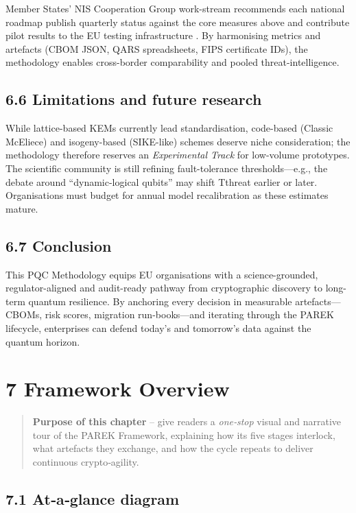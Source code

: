 \documentclass[
  english,
]{article}
\begin{document}
Member States' NIS Cooperation Group work-stream recommends each
national roadmap publish quarterly status against the core measures
above and contribute pilot results to the EU testing infrastructure . By
harmonising metrics and artefacts (CBOM JSON, QARS spreadsheets, FIPS
certificate IDs), the methodology enables cross-border comparability and
pooled threat-intelligence.

\subsection{6.6 Limitations and future
research}\label{limitations-and-future-research}

While lattice-based KEMs currently lead standardisation, code-based
(Classic McEliece) and isogeny-based (SIKE-like) schemes deserve niche
consideration; the methodology therefore reserves an \emph{Experimental
Track} for low-volume prototypes. The scientific community is still
refining fault-tolerance thresholds---e.g., the debate around
``dynamic-logical qubits'' may shift T­­threat earlier or later.
Organisations must budget for annual model recalibration as these
estimates mature.

\subsection{6.7 Conclusion}\label{conclusion}

This PQC Methodology equips EU organisations with a science-grounded,
regulator-aligned and audit-ready pathway from cryptographic discovery
to long-term quantum resilience. By anchoring every decision in
measurable artefacts---CBOMs, risk scores, migration run-books---and
iterating through the PAREK lifecycle, enterprises can defend today's
and tomorrow's data against the quantum horizon.

\section{7 Framework Overview}\label{framework-overview}

\begin{quote}
\textbf{Purpose of this chapter} -- give readers a \emph{one‑stop}
visual and narrative tour of the PAREK Framework, explaining how its
five stages interlock, what artefacts they exchange, and how the cycle
repeats to deliver continuous crypto‑agility.
\end{quote}

\subsection{7.1 At‑a‑glance diagram}\label{ataglance-diagram}
\end{document}

